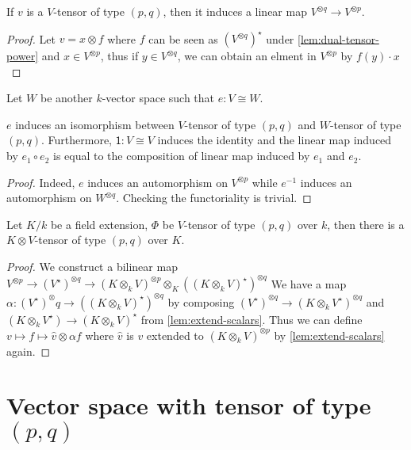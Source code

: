 \begin{lemma}
  If $v$ is a $V$-tensor of type $(p,q)$, then it induces a linear map $V^{\otimes q}\to V^{\otimes p}$.
  \leanok%
\end{lemma}
\begin{proof}
  Let $v = x \otimes f$ where $f$ can be seen as ${(V^{\otimes q})}^{\star}$ under
  \cref{lem:dual-tensor-power} and $x \in V^{\otimes p}$, thus if $y \in V^{\otimes q}$, we can obtain an elment in $V^{\otimes p}$ by $f(y)\cdot x$
\end{proof}

Let $W$ be another $k$-vector space such that $e : V \cong W$.

\begin{lemma}\label{lem:tensor-of-type-congr}
  $e$ induces an isomorphism between $V$-tensor of type $(p,q)$ and $W$-tensor of type $(p, q)$. Furthermore, $\mathsf{1} : V \cong V$ induces the identity and the linear map induced by $e_{1}\circ e_{2}$ is equal to the composition of linear map induced by $e_{1}$ and $e_{2}$.
  \leanok%
\end{lemma}
\begin{proof}
  Indeed, $e$ induces an automorphism on $V^{\otimes p}$ while $e^{-1}$ induces an automorphism on $W^{\otimes q}$. Checking the functoriality is trivial.
\end{proof}

\begin{lemma}\label{lem:extend-scalars-pq-tensor}
  \leanok%
  Let $K/k$ be a field extension, $\Phi$ be $V$-tensor of type $(p,q)$ over $k$, then there is a $K\otimes V$-tensor of type $(p,q)$ over $K$.
\end{lemma}
\begin{proof}
  We construct a bilinear map $V^{\otimes p} \to (V^{\star})^{\otimes q} \to (K \otimes_{k} V)^{\otimes p}\otimes_{K} \left({{(K \otimes_{k} V)}^{\star}}\right)^{\otimes q}$
  We have a map $\alpha : (V^{\star})^{\otimes} q \to ((K \otimes_{k} V)^{\star})^{\otimes q}$ by composing $(V^{\star})^{\otimes q} \to (K \otimes_{k} V^{\star})^{\otimes q}$ and $(K \otimes_{k} V^{\star}) \to (K \otimes_{k} V)^{\star}$ from \cref{lem:extend-scalars}. Thus we can define $v \mapsto f \mapsto \hat{v}\otimes \alpha f$ where $\hat{v}$ is $v$ extended to $(K\otimes_{k} V)^{\otimes p}$ by \cref{lem:extend-scalars} again.
\end{proof}

\section{Vector space with tensor of type $(p,q)$}

